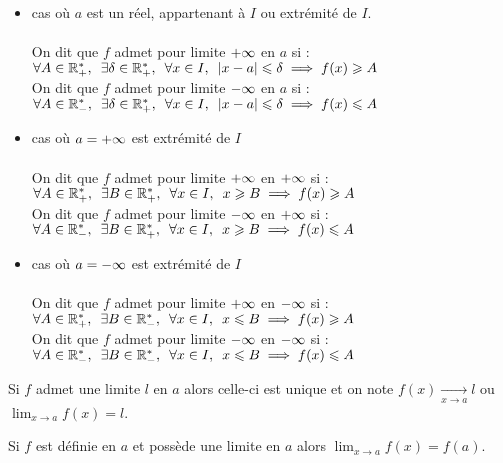 \begin{defi}
    \begin{itemize}
        \item cas où \(a\) est un réel, appartenant à \(I\) ou extrémité de \(I\).\\~\\
            On dit que \(f\) admet pour limite \(+\infty \) en \(a\) si : \(\quantifs{\forall A \in \Rps;\exists\delta \in \Rps;\forall x \in I} \abs{x-a}\leq \delta \imp f(x)\geq A\)\\
            On dit que \(f\) admet pour limite \(-\infty \) en \(a\) si : \(\quantifs{\forall A \in \Rms;\exists\delta \in \Rps;\forall x \in I} \abs{x-a}\leq \delta \imp f(x)\leq A\)
        \item cas où \(a = +\infty\) est extrémité de \(I\)\\~\\
            On dit que \(f\) admet pour limite \(+\infty \) en \(+\infty\) si : \(\quantifs{\forall A \in \Rps;\exists B \in \Rps;\forall x \in I} x\geq B \imp f(x)\geq A\)\\
            On dit que \(f\) admet pour limite \(-\infty \) en \(+\infty\) si : \(\quantifs{\forall A \in \Rms;\exists B \in \Rps;\forall x \in I} x\geq B \imp f(x)\leq A\)
        \item cas où \(a = -\infty\) est extrémité de \(I\)\\~\\
            On dit que \(f\) admet pour limite \(+\infty \) en \(-\infty\) si : \(\quantifs{\forall A \in \Rps;\exists B \in \Rms;\forall x \in I} x\leq B \imp f(x)\geq A\)\\
            On dit que \(f\) admet pour limite \(-\infty \) en \(-\infty\) si : \(\quantifs{\forall A \in \Rms;\exists B \in \Rms;\forall x \in I} x\leq B \imp f(x)\leq A\)
    \end{itemize}
\end{defi}

\begin{defprop}[Unicité]
    Si \(f\) admet une limite \(l\) en \(a\) alors celle-ci est unique et on note \(f(x)\underset{x\to a}{\to} l\) ou \(\lim_{x\to a} f(x) = l\).
\end{defprop}
\begin{defprop}
    Si \(f\) est définie en \(a\) et possède une limite en \(a\) alors \(\lim_{x\to a} f(x) = f(a)\).
\end{defprop}

